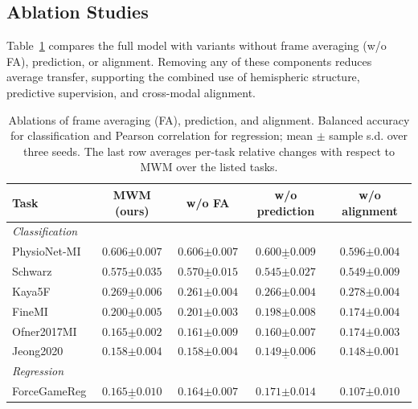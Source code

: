 \subsection{Ablation Studies}
\label{sec:mwm-ablations}

Table~\ref{tab:mwm-ablation} compares the full model with variants without frame averaging (w/o FA), prediction, or alignment. Removing any of these components reduces average transfer, supporting the combined use of hemispheric structure, predictive supervision, and cross-modal alignment.

\begin{table}[t]
\centering
\small
\setlength{\tabcolsep}{4pt}
\caption{Ablations of frame averaging (FA), prediction, and alignment. Balanced accuracy for classification and Pearson correlation for regression; mean $\pm$ sample s.d. over three seeds. The last row averages per-task relative changes with respect to MWM over the listed tasks.}
\label{tab:mwm-ablation}
\begin{tabular}{lcccc}
\toprule
Task & \textbf{MWM (ours)} & w/o FA & w/o prediction & w/o alignment \\
\midrule
\multicolumn{5}{l}{\emph{Classification}} \\
PhysioNet-MI & $\mathbf{0.606{\scriptstyle\pm0.007}}$ & $\mathbf{0.606{\scriptstyle\pm0.007}}$ & $\underline{0.600{\scriptstyle\pm0.009}}$ & $0.596{\scriptstyle\pm0.004}$ \\
Schwarz & $\mathbf{0.575{\scriptstyle\pm0.035}}$ & $\underline{0.570{\scriptstyle\pm0.015}}$ & $0.545{\scriptstyle\pm0.027}$ & $0.549{\scriptstyle\pm0.009}$ \\
Kaya5F & $\underline{0.269{\scriptstyle\pm0.006}}$ & $0.261{\scriptstyle\pm0.004}$ & $0.266{\scriptstyle\pm0.004}$ & $\mathbf{0.278{\scriptstyle\pm0.004}}$ \\
FineMI & $\underline{0.200{\scriptstyle\pm0.005}}$ & $\mathbf{0.201{\scriptstyle\pm0.003}}$ & $0.198{\scriptstyle\pm0.008}$ & $0.174{\scriptstyle\pm0.004}$ \\
Ofner2017MI & $\underline{0.165{\scriptstyle\pm0.002}}$ & $0.161{\scriptstyle\pm0.009}$ & $0.160{\scriptstyle\pm0.007}$ & $\mathbf{0.174{\scriptstyle\pm0.003}}$ \\
Jeong2020 & $\mathbf{0.158{\scriptstyle\pm0.004}}$ & $\mathbf{0.158{\scriptstyle\pm0.004}}$ & $\underline{0.149{\scriptstyle\pm0.006}}$ & $0.148{\scriptstyle\pm0.001}$ \\
\midrule
\multicolumn{5}{l}{\emph{Regression}} \\
ForceGameReg & $\underline{0.165{\scriptstyle\pm0.010}}$ & $0.164{\scriptstyle\pm0.007}$ & $\mathbf{0.171{\scriptstyle\pm0.014}}$ & $0.107{\scriptstyle\pm0.010}$ \\

\end{tabular}
\end{table}

